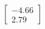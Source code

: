 \documentclass[preview]{standalone}
\begin{document}
\begin{align*}
\begin{bmatrix} -4.66 \\ 2.79 \end{bmatrix}
\end{align*}
\end{document}
